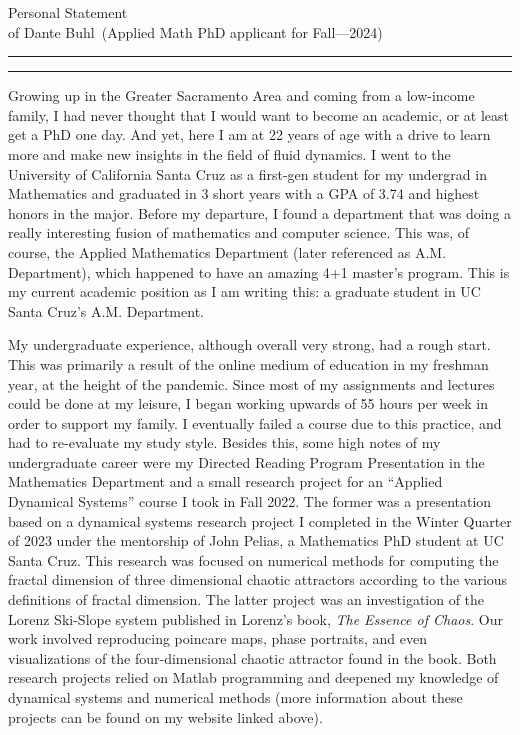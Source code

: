 \documentclass{article}
\newcommand{\soptitle}{Personal Statement}
\newcommand{\yourname}{Dante Buhl}
\begin{document}
\begin{center}\LARGE\soptitle\\
\large of \yourname\ (Applied Math PhD applicant for Fall---2024)
\end{center}

\hrule
\vspace{1pt}
\hrule height 1pt

\bigskip

\large
Growing up in the Greater Sacramento Area and coming from a low-income family, I had never thought that I would want to become an academic, or at least get a PhD one day. And yet, here I am at 22 years of age with a drive to learn more and make new insights in the field of fluid dynamics. I went to the University of California Santa Cruz as a first-gen student for my undergrad in Mathematics and graduated in 3 short years with a GPA of 3.74 and highest honors in the major. Before my departure, I found a department that was doing a really interesting fusion of mathematics and computer science. This was, of course, the Applied Mathematics Department (later referenced as A.M. Department), which happened to have an amazing 4+1 master's program. This is my current academic position as I am writing this: a graduate student in UC Santa Cruz's A.M. Department. 

My undergraduate experience, although overall very strong, had a rough start. This was primarily a result of the online medium of education in my freshman year, at the height of the pandemic. Since most of my assignments and lectures could be done at my leisure, I began working upwards of 55 hours per week in order to support my family. I eventually failed a course due to this practice, and had to re-evaluate my study style. Besides this, some high notes of my undergraduate career were my Directed Reading Program Presentation in the Mathematics Department and a small research project for an ``Applied Dynamical Systems'' course I took in Fall 2022. The former was a presentation based on a dynamical systems research project I completed in the Winter Quarter of 2023 under the mentorship of John Pelias, a Mathematics PhD student at UC Santa Cruz. This research was focused on numerical methods for computing the fractal dimension of three dimensional chaotic attractors according to the various definitions of fractal dimension. The latter project was an investigation of the Lorenz Ski-Slope system published in Lorenz's book, \textit{The Essence of Chaos}. Our work involved reproducing poincare maps, phase portraits, and even visualizations of the four-dimensional chaotic attractor found in the book. Both research projects relied on Matlab programming and deepened my knowledge of dynamical systems and numerical methods (more information about these projects can be found on my website linked above). 
\end{document}
